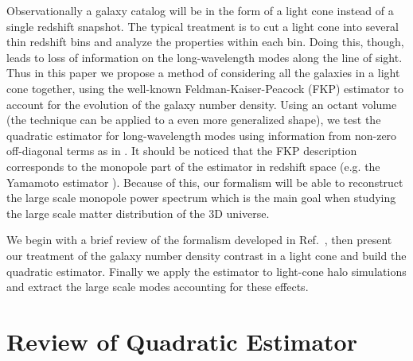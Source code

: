 \documentclass[prd,amsmath,amssymb,floatfix,superscriptaddress,nofootinbib,twocolumn]{revtex4-1}
\newcommand{\vrr}{\vec{r}}
\begin{document}
Observationally a galaxy catalog will be in the form of a light cone
\cite{Carroll:1997gr} instead of a single redshift snapshot.
The typical treatment is
to cut a light cone into several thin redshift bins
\cite{Chuang:2016uuz} and analyze the properties within each
bin. Doing this, though, leads to loss of information on the long-wavelength
modes along the line of sight. Thus in this paper we propose a method of
considering all the galaxies in a light cone together, using the
well-known Feldman-Kaiser-Peacock (FKP) estimator \cite{Feldman:1993ky} to
account for the evolution of the galaxy number density. Using an
octant volume (the technique can be applied to a even
more generalized shape), we
test the quadratic estimator for long-wavelength modes using
information from non-zero off-diagonal terms as in
\cite{Li:2020fir}. It should be  noticed
that the FKP description corresponds to
the monopole part of the estimator in redshift space (e.g. the
Yamamoto estimator \cite{Yamamoto:2005dz}\cite{Bianchi:2015oia}).
Because of this,
our formalism will be able to reconstruct the large scale monopole power
spectrum which is the main goal when studying the large scale matter
distribution of the 3D universe.


We begin with a brief review of the formalism developed in
Ref.~\cite{Li:2020fir}, then present our treatment of the galaxy
number density contrast in a light cone and build the quadratic
estimator. Finally we apply the estimator to light-cone halo simulations and extract the large scale modes accounting for
these effects.
\clearpage


\section{Review of Quadratic Estimator} \label{sec2}
\end{document}
